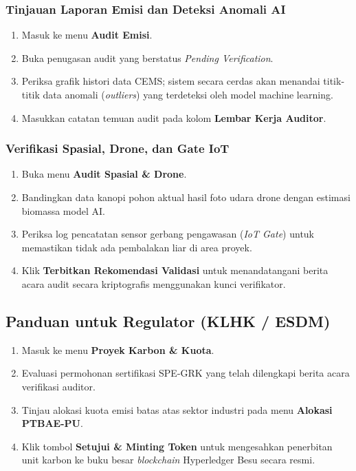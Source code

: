 \subsubsection{Tinjauan Laporan Emisi dan Deteksi Anomali AI}
\begin{enumerate}
    \item Masuk ke menu \textbf{Audit Emisi}.
    \item Buka penugasan audit yang berstatus \textit{Pending Verification}.
    \item Periksa grafik histori data CEMS; sistem secara cerdas akan menandai titik-titik data anomali (\textit{outliers}) yang terdeteksi oleh model machine learning.
    \item Masukkan catatan temuan audit pada kolom \textbf{Lembar Kerja Auditor}.
\end{enumerate}

\subsubsection{Verifikasi Spasial, Drone, dan Gate IoT}
\begin{enumerate}
    \item Buka menu \textbf{Audit Spasial \& Drone}.
    \item Bandingkan data kanopi pohon aktual hasil foto udara drone dengan estimasi biomassa model AI.
    \item Periksa log pencatatan sensor gerbang pengawasan (\textit{IoT Gate}) untuk memastikan tidak ada pembalakan liar di area proyek.
    \item Klik \textbf{Terbitkan Rekomendasi Validasi} untuk menandatangani berita acara audit secara kriptografis menggunakan kunci verifikator.
\end{enumerate}

\subsection{Panduan untuk Regulator (KLHK / ESDM)}
\begin{enumerate}
    \item Masuk ke menu \textbf{Proyek Karbon \& Kuota}.
    \item Evaluasi permohonan sertifikasi SPE-GRK yang telah dilengkapi berita acara verifikasi auditor.
    \item Tinjau alokasi kuota emisi batas atas sektor industri pada menu \textbf{Alokasi PTBAE-PU}.
    \item Klik tombol \textbf{Setujui \& Minting Token} untuk mengesahkan penerbitan unit karbon ke buku besar \textit{blockchain} Hyperledger Besu secara resmi.
\end{enumerate}

